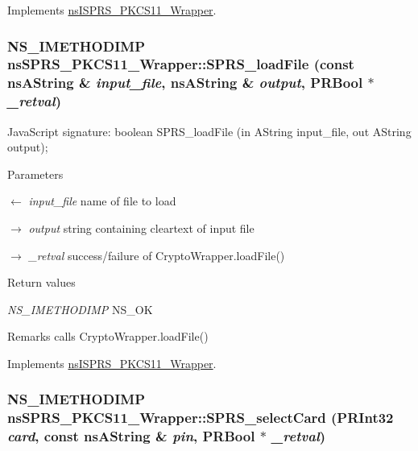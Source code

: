 Implements \hyperlink{classnsISPRS__PKCS11__Wrapper}{nsISPRS\_\-PKCS11\_\-Wrapper}.\hypertarget{classnsSPRS__PKCS11__Wrapper_a9c7932c785ee05f74583e994405183ca}{
\subsubsection[{SPRS\_\-loadFile}]{\setlength{\rightskip}{0pt plus 5cm}NS\_\-IMETHODIMP nsSPRS\_\-PKCS11\_\-Wrapper::SPRS\_\-loadFile (const nsAString \& {\em input\_\-file}, \/  nsAString \& {\em output}, \/  PRBool $\ast$ {\em \_\-retval})}}
\label{classnsSPRS__PKCS11__Wrapper_a9c7932c785ee05f74583e994405183ca}
JavaScript signature: boolean SPRS\_\-loadFile (in AString input\_\-file, out AString output); 
\begin{DoxyParams}{Parameters}
\item[\mbox{$\leftarrow$} {\em input\_\-file}]name of file to load \item[\mbox{$\rightarrow$} {\em output}]string containing cleartext of input file \item[\mbox{$\rightarrow$} {\em \_\-retval}]success/failure of CryptoWrapper.loadFile() \end{DoxyParams}

\begin{DoxyRetVals}{Return values}
\item[{\em NS\_\-IMETHODIMP}]NS\_\-OK \end{DoxyRetVals}
\begin{DoxyRemark}{Remarks}
calls CryptoWrapper.loadFile() 
\end{DoxyRemark}


Implements \hyperlink{classnsISPRS__PKCS11__Wrapper}{nsISPRS\_\-PKCS11\_\-Wrapper}.\hypertarget{classnsSPRS__PKCS11__Wrapper_af5ef8c8041adef789e6e6d3d38237a2b}{
\subsubsection[{SPRS\_\-selectCard}]{\setlength{\rightskip}{0pt plus 5cm}NS\_\-IMETHODIMP nsSPRS\_\-PKCS11\_\-Wrapper::SPRS\_\-selectCard (PRInt32 {\em card}, \/  const nsAString \& {\em pin}, \/  PRBool $\ast$ {\em \_\-retval})}}
\label{classnsSPRS__PKCS11__Wrapper_af5ef8c8041adef789e6e6d3d38237a2b}


